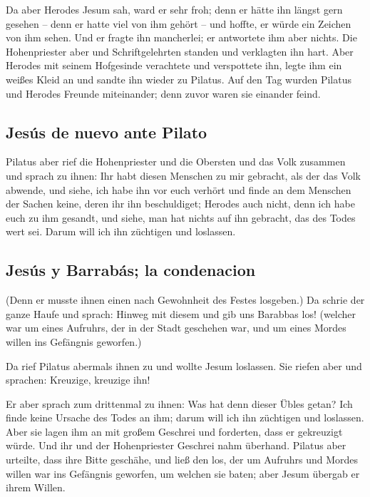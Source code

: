  Da aber Herodes Jesum sah, ward er sehr froh; denn er
hätte ihn längst gern gesehen -- denn er hatte viel von ihm gehört --
und hoffte, er würde ein Zeichen von ihm sehen.  Und er
fragte ihn mancherlei; er antwortete ihm aber nichts. 
Die Hohenpriester aber und Schriftgelehrten standen und verklagten ihn
hart.  Aber Herodes mit seinem Hofgesinde verachtete und
verspottete ihn, legte ihm ein weißes Kleid an und sandte ihn wieder zu
Pilatus.  Auf den Tag wurden Pilatus und Herodes Freunde
miteinander; denn zuvor waren sie einander feind.

\hypertarget{jesuxfas-de-nuevo-ante-pilato}{%
\subsection{Jesús de nuevo ante
Pilato}\label{jesuxfas-de-nuevo-ante-pilato}}

 Pilatus aber rief die Hohenpriester und die Obersten und
das Volk zusammen  und sprach zu ihnen: Ihr habt diesen
Menschen zu mir gebracht, als der das Volk abwende, und siehe, ich habe
ihn vor euch verhört und finde an dem Menschen der Sachen keine, deren
ihr ihn beschuldiget;  Herodes auch nicht, denn ich habe
euch zu ihm gesandt, und siehe, man hat nichts auf ihn gebracht, das des
Todes wert sei.  Darum will ich ihn züchtigen und
loslassen.

\hypertarget{jesuxfas-y-barrabuxe1s-la-condenacion}{%
\subsection{Jesús y Barrabás; la
condenacion}\label{jesuxfas-y-barrabuxe1s-la-condenacion}}

 (Denn er musste ihnen einen nach Gewohnheit des Festes
losgeben.)  Da schrie der ganze Haufe und sprach: Hinweg
mit diesem und gib uns Barabbas los!  (welcher war um
eines Aufruhrs, der in der Stadt geschehen war, und um eines Mordes
willen ins Gefängnis geworfen.)

 Da rief Pilatus abermals ihnen zu und wollte Jesum
loslassen.  Sie riefen aber und sprachen: Kreuzige,
kreuzige ihn!

 Er aber sprach zum drittenmal zu ihnen: Was hat denn
dieser Übles getan? Ich finde keine Ursache des Todes an ihm; darum will
ich ihn züchtigen und loslassen.  Aber sie lagen ihm an
mit großem Geschrei und forderten, dass er gekreuzigt würde. Und ihr und
der Hohenpriester Geschrei nahm überhand.  Pilatus aber
urteilte, dass ihre Bitte geschähe,  und ließ den los,
der um Aufruhrs und Mordes willen war ins Gefängnis geworfen, um welchen
sie baten; aber Jesum übergab er ihrem Willen.

